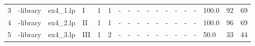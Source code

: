 \begin{tabular}{llllllllllllllllll}
3  &  -library &  ex4\_1.lp &     I &               1 &             1 &           - &         - &         - &            - &          - &          - &         - &       - &       - &      100.0 &       92 &       69 \\
4  &  -library &  ex4\_2.lp &    II &               1 &             1 &           - &         - &         - &            - &          - &          - &         - &       - &       - &      100.0 &       96 &       69 \\
5  &  -library &  ex4\_3.lp &   III &               1 &             2 &           - &         - &         - &            - &          - &          - &         - &       - &       - &       50.0 &       33 &       44 \\
\bottomrule
\end{tabular}
